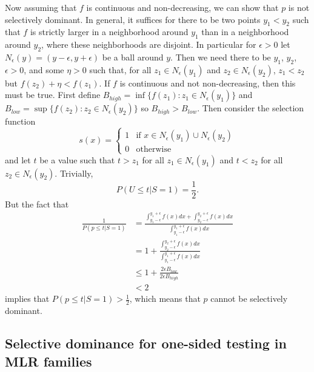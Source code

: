 \documentclass{article}
\begin{document}
\begin{appendix}
Now assuming that $f$ is continuous and non-decreasing, we can show that $p$ is not selectively dominant. In general, it suffices for there to be two points $y_1 < y_2$ such that $f$ is strictly larger in a neighborhood around $y_1$ than in a neighborhood around $y_2$, where these neighborhoods are disjoint. In particular for $\epsilon > 0$ let $N_{\epsilon}(y) = (y - \epsilon, y + \epsilon )$ be a ball around $y$. Then we need there to be $y_1$, $y_2$, $\epsilon > 0$, and some $\eta > 0$ such that, for all $z_1 \in N_{\epsilon}(y_1)$ and $z_2 \in N_{\epsilon}(y_2)$,  $z_1  < z_2$ but $f(z_2) + \eta < f(z_1) $. If $f$ is continuous and not non-decreasing, then this must be true. First define $B_{high} = \inf \{f(z_1): z_1 \in N_{\epsilon}(y_1)\}$ and  $B_{low} = \sup \{f(z_2): z_2 \in N_{\epsilon}(y_2)\}$ so $B_{high}  > B_{low}$. Then consider the selection function 
\begin{equation*}
s(x)= \begin{cases}
1 &\text{if } x \in N_{\epsilon}(y_1) \cup N_{\epsilon}(y_2) \\
0 &\text{otherwise }
\end{cases}
\end{equation*}
and let $t$ be a value such that $t > z_1$ for all $z_1 \in N_{\epsilon}(y_1)$ and $t < z_2$ for all $z_2 \in  N_{\epsilon}(y_2)$. Trivially, 
\begin{equation*}
    P(U \leq t | S = 1) = \frac{1}{2}. 
\end{equation*}
But the fact that 
\begin{align*}
    \frac{1}{P(p \leq t | S = 1)} &= \frac{ \int_{y_1 - \epsilon}^{y_1 + \epsilon} f(x) dx + \int_{y_2 - \epsilon}^{y_2 + \epsilon} f(x) dx  }{\int_{y_1 - \epsilon}^{y_1 + \epsilon} f(x) dx}\\
    &= 1 + \frac{ \int_{y_2 - \epsilon}^{y_2 + \epsilon} f(x) dx  }{\int_{y_1 - \epsilon}^{y_1 + \epsilon} f(x) dx}\\
    &\leq 1 + \frac{ 2\epsilon B_{low}  }{2\epsilon B_{high} }\\
    & < 2
\end{align*}
implies that $P(p \leq t | S = 1) > \frac{1}{2} $, which means that $p$ cannot be selectively dominant. 

\subsection{Selective dominance for one-sided testing in MLR families}
\label{sec:mlr_selective_dominance_appdx}


\end{appendix}
\end{document}
